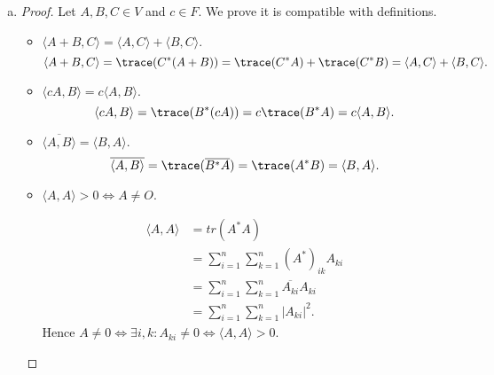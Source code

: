 \begin{Exercise}
\begin{enumerate}[(a)]
\item
\begin{proof}
Let $A,B,C\in V$ and $c\in F$. We prove it is compatible with definitions.
\begin{itemize}
\item $\langle A+B,C \rangle = \langle A,C \rangle + \langle B,C \rangle$.
$$
\langle A+B,C \rangle
= \trace(C^*(A+B))
= \trace(C^* A) + \trace(C^* B)
= \langle A,C \rangle + \langle B,C \rangle.
$$

\item $\langle c A, B \rangle = c\langle A,B \rangle$.
$$
\langle c A,B \rangle
= \trace(B^*(c A) )
= c \trace( B^* A)
= c\langle A,B \rangle.
$$

\item $\overline{\langle A,B \rangle} = \langle B,A \rangle$.
$$
\overline{\langle A,B \rangle}
= \trace(\overline{B^* A} )
= \trace(A^* B)
= \langle B, A \rangle.
$$

\item $\langle A,A \rangle > 0\iff A\neq O$.

\begin{align*}
\langle A,A \rangle
&= tr(A^* A) \\
&= \sum_{i=1}^{n} \sum_{k=1}^{n} (A^*)_{i k} A_{k i} \\
&=  \sum_{i=1}^{n} \sum_{k=1}^{n} \overline{A_{k i}} A_{k i} \\
&= \sum_{i=1}^{n} \sum_{k=1}^{n} |A_{k i}|^2.
\end{align*}
Hence $A\neq 0 \iff \exists i,k:A_{k i} \neq 0 \iff \langle A,A \rangle > 0$.
\end{itemize}
\end{proof}
\end{enumerate}
\end{Exercise}